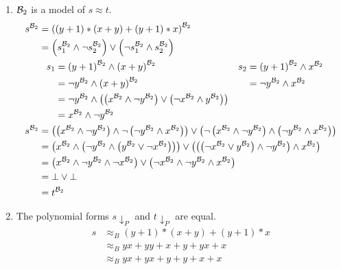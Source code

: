 	\begin{enumerate}
		\item ${\mathcal{B}_2}$ is a model of $s\approx t$.
		      \begin{align*}
		      	s^{\mathcal{B}_2} & =\left( \left( y+1\right)*\left( x+y\right)+\left( y+1\right)*x\right)^{\mathcal{B}_2}       \\
		      	& =\left( s_1^{\mathcal{B}_2}\wedge \neg s_2^{\mathcal{B}_2}\right)\vee\left( \neg s_1^{\mathcal{B}_2}\wedge s_2^{\mathcal{B}_2}\right) \\
		      	&\hspace{8pt}\begin{aligned}
		      	s_1 & =\left( y+1\right)^{\mathcal{B}_2}\wedge\left( x+y\right)^{\mathcal{B}_2} & s_2 & =   \left( y+1\right)^{\mathcal{B}_2}\wedge x^{\mathcal{B}_2} \\
		      	    & =\neg y^{\mathcal{B}_2}\wedge\left( x+y\right)^{\mathcal{B}_2}            &     & = \neg y^{\mathcal{B}_2}\wedge x^{\mathcal{B}_2}              \\
		      	&=\neg y^{\mathcal{B}_2}\wedge\left( \left( x^{\mathcal{B}_2}\wedge\neg y^{\mathcal{B}_2}\right)\vee\left( \neg x^{\mathcal{B}_2}\wedge y^{\mathcal{B}_2}\right)\right)\\
		      	& = x^{\mathcal{B}_2}\wedge\neg y^{\mathcal{B}_2}
		      	\end{aligned}\\
		      	s^{\mathcal{B}_2} & =\left( \left( x^{\mathcal{B}_2}\wedge\neg y^{\mathcal{B}_2}\right)\wedge \neg \left( \neg y^{\mathcal{B}_2}\wedge x^{\mathcal{B}_2}\right)\right)\vee\left( \neg\left( x^{\mathcal{B}_2}\wedge\neg y^{\mathcal{B}_2}\right)\wedge \left( \neg y^{\mathcal{B}_2}\wedge x^{\mathcal{B}_2}\right)\right) \\
		      	& =\left( x^{\mathcal{B}_2}\wedge\left( \neg y^{\mathcal{B}_2}\wedge \left( y^{\mathcal{B}_2}\vee\neg x^{\mathcal{B}_2}\right)\right)\right)\vee\left( \left( \left( \neg x^{\mathcal{B}_2}\vee y^{\mathcal{B}_2}\right)\wedge \neg y^{\mathcal{B}_2}\right)\wedge x^{\mathcal{B}_2}\right)              \\
		      	& =\left( x^{\mathcal{B}_2}\wedge\neg y^{\mathcal{B}_2}\wedge \neg x^{\mathcal{B}_2}\right)\vee\left( \neg x^{\mathcal{B}_2}\wedge \neg y^{\mathcal{B}_2}\wedge x^{\mathcal{B}_2}\right)                                                                                             \\
		      	& =\bot\vee\bot\\
		      	& =t^{\mathcal{B}_2} 
		      \end{align*}
		\item The polynomial forms $s{\downarrow_P}$ and $t{\downarrow_P}$ are equal.
		      \begin{align*}
		      	s & \approx_B (y+1)*(x+y)+(y+1)*x \\
		      	  & \approx_B yx+yy+x+y+yx+x      \\
		      	  & \approx_B yx+yx+y+y+x+x       \\

\end{align*}
\end{enumerate}
